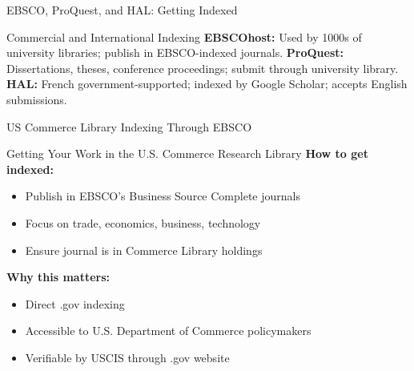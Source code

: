 \documentclass[11pt]{beamer}
\begin{document}
	\begin{frame}{EBSCO, ProQuest, and HAL: Getting Indexed}
		\small
		\begin{block}{Commercial and International Indexing}
			\textbf{EBSCOhost:} Used by 1000s of university libraries; publish in EBSCO-indexed journals.
			\vspace{0.1cm}
			\textbf{ProQuest:} Dissertations, theses, conference proceedings; submit through university library.
			\vspace{0.1cm}
			\textbf{HAL:} French government-supported; indexed by Google Scholar; accepts English submissions.
		\end{block}
	\end{frame}
	
	\begin{frame}{US Commerce Library Indexing Through EBSCO}
		\small
		\begin{block}{Getting Your Work in the U.S. Commerce Research Library}
			\textbf{How to get indexed:}
			\begin{itemize}
				\item Publish in EBSCO's Business Source Complete journals
				\item Focus on trade, economics, business, technology
				\item Ensure journal is in Commerce Library holdings
			\end{itemize}
			\textbf{Why this matters:}
			\begin{itemize}
				\item Direct .gov indexing
				\item Accessible to U.S. Department of Commerce policymakers
				\item Verifiable by USCIS through .gov website
			\end{itemize}
		\end{block}
	\end{frame}
	
	
\end{document}
